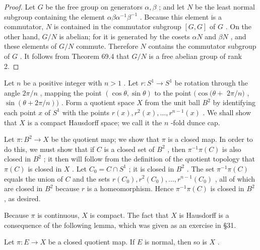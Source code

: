 \begin{proof}Let \(G\) be the free group on generators \(\alpha ,\beta\) ; and let \(N\) be the least normal subgroup containing the element \({\alpha \beta }{\alpha }^{-1}{\beta }^{-1}\) . Because this element is a commutator, \(N\) is contained in the commutator subgroup \(\left\lbrack  {G,G}\right\rbrack\) of \(G\) . On the other hand, \(G/N\) is abelian; for it is generated by the cosets \({\alpha N}\) and \({\beta N}\) , and these elements of \(G/N\) commute. Therefore \(N\) contains the commutator subgroup of \(G\) .
It follows from Theorem 69.4 that \(G/N\) is a free abelian group of rank 2.
\end{proof}
\begin{definition} Let \(n\) be a positive integer with \(n > 1\) . Let \(r : {S}^{1} \rightarrow  {S}^{1}\) be rotation through the angle \({2\pi }/n\) , mapping the point \(\left( {\cos \theta ,\sin \theta }\right)\) to the point \((\cos (\theta  +\)  \({2\pi }/n)\) , \(\sin \left( {\theta  + {2\pi }/n}\right) )\) . Form a quotient space \(X\) from the unit ball \({B}^{2}\) by identifying each point \(x\) of \({S}^{1}\) with the points \(r\left( x\right) ,{r}^{2}\left( x\right) ,\ldots ,{r}^{n - 1}\left( x\right)\) . We shall show that \(X\) is a compact Hausdorff space; we call it the \(n\) -fold dunce cap.
\end{definition}

Let \(\pi  : {B}^{2} \rightarrow  X\) be the quotient map; we show that \(\pi\) is a closed map. In order to do this, we must show that if \(C\) is a closed set of \({B}^{2}\) , then \({\pi }^{-1}\pi \left( C\right)\) is also closed in \({B}^{2}\) ; it then will follow from the definition of the quotient topology that \(\pi \left( C\right)\) is closed in \(X\) . Let \({C}_{0} = C \cap  {S}^{1}\) ; it is closed in \({B}^{2}\) . The set \({\pi }^{-1}\pi \left( C\right)\) equals the union of \(C\) and the sets \(r\left( {C}_{0}\right) ,{r}^{2}\left( {C}_{0}\right) ,\ldots ,{r}^{n - 1}\left( {C}_{0}\right)\) , all of which are closed in \({B}^{2}\) because \(r\) is a homeomorphism. Hence \({\pi }^{-1}\pi \left( C\right)\) is closed in \({B}^{2}\) , as desired.

Because \(\pi\) is continuous, \(X\) is compact. The fact that \(X\) is Hausdorff is a consequence of the following lemma, which was given as an exercise in  \S 31.

\begin{lemma} Let \(\pi  : E \rightarrow  X\) be a closed quotient map. If \(E\) is normal, then so is \(X\) .
\end{lemma}


